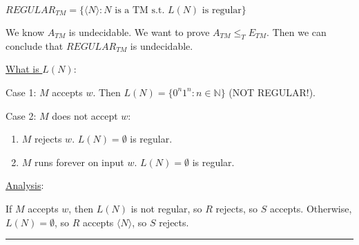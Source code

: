 \documentclass[twoside]{article}
\newenvironment{proof}{{\bf Proof:}}{\hfill\rule{2mm}{2mm}}
\begin{document}
$REGULAR_{TM} = \{\langle N \rangle : N \text{ is a TM s.t. } L(N) \text{ is regular}\}$

\begin{proof}
  We know $A_{TM}$ is undecidable. We want to prove $A_{TM} \leq_{T} E_{TM}$. Then we can conclude that $REGULAR_{TM}$ is undecidable.
  
  \underline{What is $L(N)$}:
  
  Case 1: $M$ accepts $w$. Then $L(N) = \{0^n1^n : n \in \mathbb{N}\}$ (NOT REGULAR!).
  
  Case 2: $M$ does not accept $w$:
  \begin{enumerate}[label=2\emph{\alph*}:]
    \item $M$ rejects $w$. $L(N) = \emptyset$ is regular.
    \item $M$ runs forever on input $w$. $L(N) = \emptyset$ is regular.
  \end{enumerate}
  
  \underline{Analysis}:
  
  If $M$ accepts $w$, then $L(N)$ is not regular, so $R$ rejects, so $S$ accepts. Otherwise, $L(N) = \emptyset$, so $R$ accepts $\langle N \rangle$, so $S$ rejects.
\end{proof}
\end{document}
